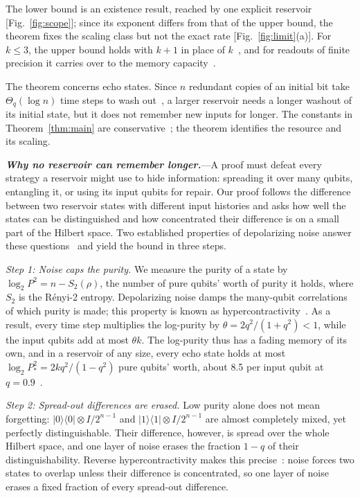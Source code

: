 \documentclass[aps,prl,twocolumn,superscriptaddress,floatfix]{revtex4-2}
\theoremstyle{plain}
\newcommand{\ketbra}[2]{|#1\rangle\!\langle #2|}
\newcommand{\runin}[1]{\textit{\textbf{#1}}---}
\begin{document}
The lower bound is an existence result, reached by one explicit reservoir [Fig.~\ref{fig:scope}]; since its exponent differs from that of the upper bound, the theorem fixes the scaling class but not the exact rate [Fig.~\ref{fig:limit}(a)]. For $k\le3$, the upper bound holds with $k+1$ in place of $k$~\cite{SM}, and for readouts of finite precision it carries over to the memory capacity~\cite{Jaeger2002,SM}.

The theorem concerns echo states. Since $n$ redundant copies of an initial bit take $\Theta_q(\log n)$ time steps to wash out~\cite{SM}, a larger reservoir needs a longer washout of its initial state, but it does not remember new inputs for longer. The constants in Theorem~\ref{thm:main} are conservative~\cite{SM}; the theorem identifies the resource and its scaling.

\runin{Why no reservoir can remember longer.}A proof must defeat every strategy a reservoir might use to hide information: spreading it over many qubits, entangling it, or using its input qubits for repair. Our proof follows the difference between two reservoir states with different input histories and asks how well the states can be distinguished and how concentrated their difference is on a small part of the Hilbert space. Two established properties of depolarizing noise answer these questions~\cite{King2014,Cubitt2015} and yield the bound in three steps.

\emph{Step 1: Noise caps the purity.} We measure the purity of a state by $\log_2P^2=n-S_2(\rho)$, the number of pure qubits' worth of purity it holds, where $S_2$ is the R\'enyi-2 entropy. Depolarizing noise damps the many-qubit correlations of which purity is made; this property is known as hypercontractivity~\cite{King2014}. As a result, every time step multiplies the log-purity by $\theta=2q^2/(1+q^2)<1$, while the input qubits add at most $\theta k$. The log-purity thus has a fading memory of its own, and in a reservoir of any size, every echo state holds at most $\log_2P_*^2=2kq^2/(1-q^2)$ pure qubits' worth, about 8.5 per input qubit at $q=0.9$~\cite{SM}.

\emph{Step 2: Spread-out differences are erased.} Low purity alone does not mean forgetting: $\ketbra00\otimes I/2^{n-1}$ and $\ketbra11\otimes I/2^{n-1}$ are almost completely mixed, yet perfectly distinguishable. Their difference, however, is spread over the whole Hilbert space, and one layer of noise erases the fraction $1-q$ of their distinguishability. Reverse hypercontractivity makes this precise~\cite{Cubitt2015}: noise forces two states to overlap unless their difference is concentrated, so one layer of noise erases a fixed fraction of every spread-out difference.
\end{document}
